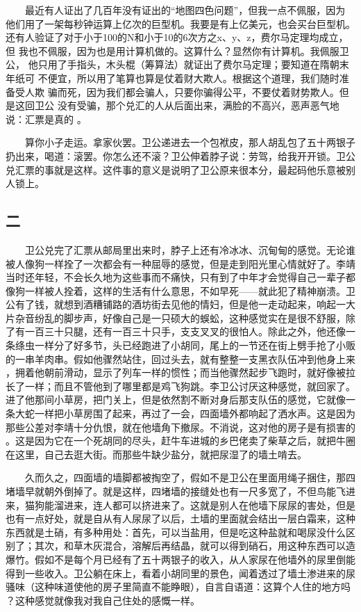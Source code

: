  　　最近有人证出了几百年没有证出的“地图四色问题”，但我一点不佩服，因为 他们用了一架每秒钟运算上亿次的巨型机。我要是有上亿美元，也会买台巨型机。 还有人验证了对于小于100的N和小于10的6次方之x、y、z，费尔马定理均成立，但 我也不佩服，因为也是用计算机做的。这算什么？显然你有计算机。我佩服卫公， 他只用了手指头，木头棍（筹算法）就证出了费尔马定理；要知道在隋朝末年纸可 不便宜，所以用了笔算也算是仗着财大欺人。根据这个道理，我们随时准备受人欺 骗而死，因为我们都会骗人，只要你骗得公平，不要仗着财势欺人。但是这回卫公 没有受骗，那个兑汇的人从后面出来，满脸的不高兴，恶声恶气地说：汇票是真的 。

 　　算你小子走运。拿家伙罢。卫公递进去一个包袱皮，那人胡乱包了五十两银子 扔出来，喝道：滚罢。你怎么还不滚？卫公伸着脖子说：劳驾，给我开开锁。卫公 兑汇票的事就是这样。这件事的意义是说明了卫公原来很本分，最起码他乐意被别 人锁上。 
 
 
\subsection{二} 
 
 　　卫公兑完了汇票从邮局里出来时，脖子上还有冷冰冰、沉甸甸的感觉。无论谁 被人像狗一样拴了一次都会有一种屈辱的感觉，但是走到阳光里心情就好了。李靖 当时还年轻，不会长久地为这些事而不痛快，只有到了中年才会觉得自己一辈子都 像狗一样被人拴着，这样的生活有什么意思，不如早死——就此犯了精神崩溃。卫 公有了钱，就想到酒糟铺路的酒坊街去见他的情妇，但是他一走动起来，响起一大 片杂音纷乱的脚步声，好像自己是一只硕大的蜈蚣，这种感觉实在是很不舒服，除 了有一百三十只腿，还有一百三十只手，支支叉叉的很怕人。除此之外，他还像一 条绦虫一样分了好多节，头已经跑进了小胡同，尾上的一节还在街上劈手抢了小贩 的一串羊肉串。假如他骤然站住，回过头去，就有整整一支黑衣队伍冲到他身上来 ，拥着他朝前滑动，显示了列车一样的惯性；而当他骤然起步飞跑时，就好像被拉 长了一样；而且不管他到了哪里都是鸡飞狗跳。李卫公讨厌这种感觉，就回家了。 进了他那间小草房，把门关上，但是依然割不断对身后那支队伍的感觉，它就像一 条大蛇一样把小草房围了起来，再过了一会，四面墙外都响起了洒水声。这是因为 那些公差对李靖十分仇恨，就在他墙角下撤尿。不消说，这对他的房子是有损害的 。这是因为它在一个死胡同的尽头，赶牛车进城的乡巴佬卖了柴草之后，就把牛圈 在这里，自己去逛大街。而那些牛缺少盐分，就把尿湿了的墙土啃去。

 　　久而久之，四面墙的墙脚都被掏空了，假如不是卫公在里面用绳子捆住，那四 堵墙早就朝外倒掉了。就是这样，四堵墙的接缝处也有一尺多宽了，不但鸟能飞进 来，猫狗能溜进来，连人都可以挤进来了。这就是别人在他墙下尿尿的害处，但是 也有一点好处，就是自从有人尿尿了以后，土墙的里面就会结出一层白霜来，这种 东西就是土硝，有多种用处：首先，可以当盐用，但是吃这种盐就和喝尿没什么区 别了；其次，和草木灰混合，溶解后再结晶，就可以得到硝石，用这种东西可以造 爆竹。假如不是每个月已经有了五十两银子的收入，从人家尿在他墙外的尿里倒能 得到一些收入。卫公躺在床上，看着小胡同里的景色，闻着透过了墙土渗进来的尿 骚味（这种味道使他的房子里简直不能睁眼），自言自语道：这算个人住的地方吗 ？这种感觉就像我对我自己住处的感慨一样。

